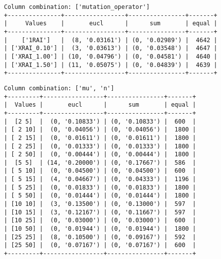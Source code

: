 \documentclass{article}
\begin{document}
\begin{verbatim}
Column combination: ['mutation_operator']
+---------------+-----------------+----------------+-------+
|     Values    |       eucl      |      sum       | equal |
+---------------+-----------------+----------------+-------+
|    ['1RAI']   |  (8, '0.03161') | (0, '0.02989') |  4642 |
| ['XRAI_0.10'] |  (3, '0.03613') | (0, '0.03548') |  4647 |
| ['XRAI_1.00'] | (10, '0.04796') | (0, '0.04581') |  4640 |
| ['XRAI_1.50'] | (11, '0.05075') | (0, '0.04839') |  4639 |
+---------------+-----------------+----------------+-------+
\end{verbatim}

\begin{verbatim}
Column combination: ['mu', 'n']
+---------+-----------------+----------------+-------+
|  Values |       eucl      |      sum       | equal |
+---------+-----------------+----------------+-------+
|  [2 5]  |  (0, '0.10833') | (0, '0.10833') |  600  |
| [ 2 10] |  (0, '0.04056') | (0, '0.04056') |  1800 |
| [ 2 15] |  (0, '0.01611') | (0, '0.01611') |  1800 |
| [ 2 25] |  (0, '0.01333') | (0, '0.01333') |  1800 |
| [ 2 50] |  (0, '0.00444') | (0, '0.00444') |  1800 |
|  [5 5]  | (14, '0.20000') | (0, '0.17667') |  586  |
| [ 5 10] |  (0, '0.04500') | (0, '0.04500') |  600  |
| [ 5 15] |  (4, '0.04667') | (0, '0.04333') |  1196 |
| [ 5 25] |  (0, '0.01833') | (0, '0.01833') |  1800 |
| [ 5 50] |  (0, '0.01444') | (0, '0.01444') |  1800 |
| [10 10] |  (3, '0.13500') | (0, '0.13000') |  597  |
| [10 15] |  (3, '0.12167') | (0, '0.11667') |  597  |
| [10 25] |  (0, '0.03000') | (0, '0.03000') |  600  |
| [10 50] |  (0, '0.01944') | (0, '0.01944') |  1800 |
| [25 25] |  (8, '0.10500') | (0, '0.09167') |  592  |
| [25 50] |  (0, '0.07167') | (0, '0.07167') |  600  |
+---------+-----------------+----------------+-------+
\end{verbatim}
\end{document}
